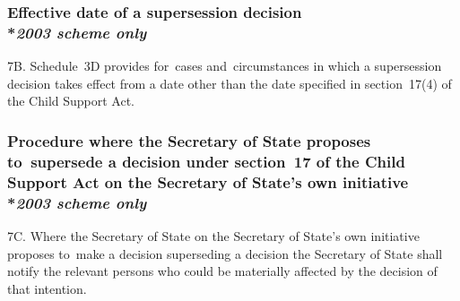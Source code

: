 \documentclass[12pt,a4paper]{article}
\begin{document}
\subsubsection[7B. Effective date of a supersession decision]{Effective date of a supersession decision\\*\emph{2003 scheme only}}

7B.  Schedule~3D provides for~cases and~circumstances in which a supersession decision takes effect from a date other than the date specified in section~17(4) of the Child Support   Act.


\subsubsection[7C. Procedure where the 
Secretary of State  %
proposes to~supersede a decision under section~17 of the Child Support Act on 
the Secretary of State's  %
own initiative]{Procedure where the 
Secretary of State  %
proposes to~supersede a decision under section~17 of the Child Support Act on 
the Secretary of State's  %
own initiative\\*\emph{2003 scheme only}}

7C.  Where the 
Secretary of State  %
on 
the Secretary of State's  %
own initiative proposes to~make a decision superseding a decision 
the Secretary of State  %
shall notify the relevant persons who could be materially affected by the decision of that intention.
\end{document}
